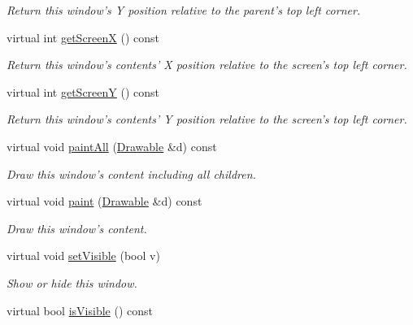 \begin{DoxyCompactItemize}
\begin{DoxyCompactList}\small\item\em Return this window's Y position relative to the parent's top left corner. \end{DoxyCompactList}\item 
\hypertarget{classGUI_1_1Window_a5e12e8944224868643de71b2d535f618}{virtual int \hyperlink{classGUI_1_1Window_a5e12e8944224868643de71b2d535f618}{get\-Screen\-X} () const }\label{classGUI_1_1Window_a5e12e8944224868643de71b2d535f618}

\begin{DoxyCompactList}\small\item\em Return this window's contents' X position relative to the screen's top left corner. \end{DoxyCompactList}\item 
\hypertarget{classGUI_1_1Window_a2ed5c9da92cfa82e48c95573765bf24b}{virtual int \hyperlink{classGUI_1_1Window_a2ed5c9da92cfa82e48c95573765bf24b}{get\-Screen\-Y} () const }\label{classGUI_1_1Window_a2ed5c9da92cfa82e48c95573765bf24b}

\begin{DoxyCompactList}\small\item\em Return this window's contents' Y position relative to the screen's top left corner. \end{DoxyCompactList}\item 
\hypertarget{classGUI_1_1Window_af06e8ead7714b1ed22512cb976b5f70b}{virtual void \hyperlink{classGUI_1_1Window_af06e8ead7714b1ed22512cb976b5f70b}{paint\-All} (\hyperlink{classGUI_1_1Drawable}{Drawable} \&d) const }\label{classGUI_1_1Window_af06e8ead7714b1ed22512cb976b5f70b}

\begin{DoxyCompactList}\small\item\em Draw this window's content including all children. \end{DoxyCompactList}\item 
\hypertarget{classGUI_1_1Window_af68ac9e0bdf2891e62800a90fa5e8ea4}{virtual void \hyperlink{classGUI_1_1Window_af68ac9e0bdf2891e62800a90fa5e8ea4}{paint} (\hyperlink{classGUI_1_1Drawable}{Drawable} \&d) const }\label{classGUI_1_1Window_af68ac9e0bdf2891e62800a90fa5e8ea4}

\begin{DoxyCompactList}\small\item\em Draw this window's content. \end{DoxyCompactList}\item 
virtual void \hyperlink{classGUI_1_1Window_a7cd474e3c89ff37a4295da00f3624cc7}{set\-Visible} (bool v)
\begin{DoxyCompactList}\small\item\em Show or hide this window. \end{DoxyCompactList}\item 
\hypertarget{classGUI_1_1Window_a2e8f1ec9d2487a885444bb14bbfddc0b}{virtual bool \hyperlink{classGUI_1_1Window_a2e8f1ec9d2487a885444bb14bbfddc0b}{is\-Visible} () const }\label{classGUI_1_1Window_a2e8f1ec9d2487a885444bb14bbfddc0b}


\end{DoxyCompactItemize}

